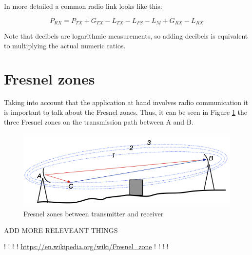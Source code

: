 In more detailed a common radio link looks like this:

\begin{equation*}\label{eq:link_budget} 
 		P_{RX} = P_{TX} + G_{TX} - L_{TX} - L_{FS} - L_{M} + G_{RX} - L_{RX}
\end{equation*}

Note that decibels are logarithmic measurements, so adding decibels is equivalent to multiplying the actual numeric ratios.


\section{Fresnel zones}
Taking into account that the application at hand involves radio communication it is important to talk about the Fresnel zones. Thus, it can be seen in Figure \ref{fig:fresnel_zones} the three Fresnel zones on the transmission path between A and B. 

\begin{figure}[h]
	\centering
	\includegraphics[scale=0.65]{figures/fresnel_zones.png}
	\caption{Fresnel zones between transmitter and receiver}
	\label{fig:fresnel_zones}
\end{figure}


ADD MORE RELEVEANT THINGS 

! ! ! ! \url{https://en.wikipedia.org/wiki/Fresnel_zone}  ! ! ! !

